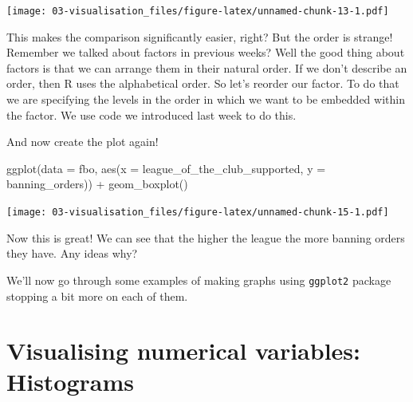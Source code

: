 \documentclass[
]{book}
\newenvironment{Shaded}{\begin{snugshade}}{\end{snugshade}}
\newcommand{\AttributeTok}[1]{\textcolor[rgb]{0.77,0.63,0.00}{#1}}
\newcommand{\FunctionTok}[1]{\textcolor[rgb]{0.00,0.00,0.00}{#1}}
\newcommand{\NormalTok}[1]{#1}
\newcommand{\OtherTok}[1]{\textcolor[rgb]{0.56,0.35,0.01}{#1}}
\newcommand{\SpecialCharTok}[1]{\textcolor[rgb]{0.00,0.00,0.00}{#1}}
\newcommand{\StringTok}[1]{\textcolor[rgb]{0.31,0.60,0.02}{#1}}
\begin{document}
\texttt{[image: 03-visualisation\_files/figure-latex/unnamed-chunk-13-1.pdf]}

This makes the comparison significantly easier, right? But the order is strange! Remember we talked about factors in previous weeks? Well the good thing about factors is that we can arrange them in their natural order. If we don't describe an order, then R uses the alphabetical order. So let's reorder our factor. To do that we are specifying the levels in the order in which we want to be embedded within the factor. We use code we introduced last week to do this.

\begin{Shaded}
\end{Shaded}

And now create the plot again!

\begin{Shaded}
\begin{Highlighting}[]
\FunctionTok{ggplot}\NormalTok{(}\AttributeTok{data =}\NormalTok{ fbo, }\FunctionTok{aes}\NormalTok{(}\AttributeTok{x =}\NormalTok{ league\_of\_the\_club\_supported, }\AttributeTok{y =}\NormalTok{ banning\_orders)) }\SpecialCharTok{+} 
  \FunctionTok{geom\_boxplot}\NormalTok{() }
\end{Highlighting}
\end{Shaded}

\texttt{[image: 03-visualisation\_files/figure-latex/unnamed-chunk-15-1.pdf]}

Now this is great! We can see that the higher the league the more banning orders they have. Any ideas why?

We'll now go through some examples of making graphs using \texttt{ggplot2} package stopping a bit more on each of them.

\hypertarget{visualising-numerical-variables-histograms}{%
\section{Visualising numerical variables: Histograms}\label{visualising-numerical-variables-histograms}}
\end{document}
